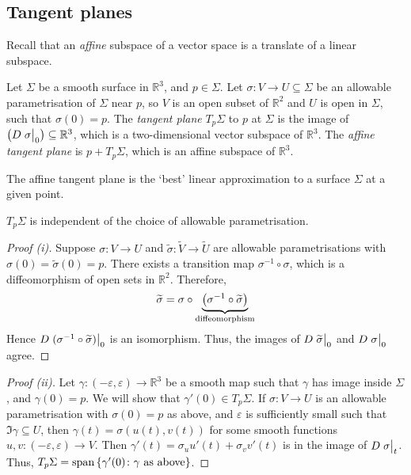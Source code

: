 \subsection{Tangent planes}
Recall that an \textit{affine} subspace of a vector space is a translate of a linear subspace.
\begin{definition}
	Let \( \Sigma \) be a smooth surface in \( \mathbb R^3 \), and \( p \in \Sigma \).
	Let \( \sigma \colon V \to U \subseteq \Sigma \) be an allowable parametrisation of \( \Sigma \) near \( p \), so \( V \) is an open subset of \( \mathbb R^2 \) and \( U \) is open in \( \Sigma \), such that \( \sigma(0) = p \).
	The \textit{tangent plane} \( T_p \Sigma \) to \( p \) at \( \Sigma \) is the image of \( \qty(D \eval{\sigma}_0) \subseteq \mathbb R^3 \), which is a two-dimensional vector subspace of \( \mathbb R^3 \).
	The \textit{affine tangent plane} is \( p + T_p \Sigma \), which is an affine subspace of \( \mathbb R^3 \).
\end{definition}
\begin{remark}
	The affine tangent plane is the `best' linear approximation to a surface \( \Sigma \) at a given point.
\end{remark}
\begin{lemma}
	\( T_p \Sigma \) is independent of the choice of allowable parametrisation.
\end{lemma}
\begin{proof}[Proof (i)]
	Suppose \( \sigma \colon V \to U \) and \( \widetilde \sigma \colon \widetilde V \to \widetilde U \) are allowable parametrisations with \( \sigma(0) = \widetilde \sigma(0) = p \).
	There exists a transition map \( \sigma^{-1} \circ \sigma \), which is a diffeomorphism of open sets in \( \mathbb R^2 \).
	Therefore,
	\[ \widetilde \sigma = \sigma \circ \underbrace{\qty(\sigma^{-1} \circ \widetilde \sigma)}_{\text{diffeomorphism}} \]
	Hence \( D\eval{(\sigma^{-1} \circ \widetilde \sigma)}_{0} \) is an isomorphism.
	Thus, the images of \( D \eval{\widetilde \sigma}_0 \) and \( D \eval{\sigma}_0 \) agree.
\end{proof}
\begin{proof}[Proof (ii)]
	Let \( \gamma \colon (-\varepsilon, \varepsilon) \to \mathbb R^3 \) be a smooth map such that \( \gamma \) has image inside \( \Sigma \), and \( \gamma(0) = p \).
	We will show that \( \gamma'(0) \in T_p \Sigma \).
	If \( \sigma \colon V \to U \) is an allowable parametrisation with \( \sigma(0) = p \) as above, and \( \varepsilon \) is sufficiently small such that \( \Im \gamma \subseteq U \), then \( \gamma(t) = \sigma(u(t), v(t)) \) for some smooth functions \( u, v \colon (-\varepsilon, \varepsilon) \to V \).
	Then \( \gamma'(t) = \sigma_u u'(t) + \sigma_v v'(t) \) is in the image of \( D \eval{\sigma}_t \).
	Thus, \( T_p \Sigma = \operatorname{span} \qty{ \gamma'(0) \colon \gamma \text{ as above} } \).
\end{proof}
